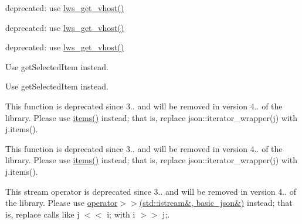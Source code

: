 \begin{DoxyRefList}
deprecated\+: use \hyperlink{group__context-and-vhost_ga26bb300d01fa3e443d4ccdf384e99c7f}{lws\+\_\+get\+\_\+vhost()} 

deprecated\+: use \hyperlink{group__context-and-vhost_ga26bb300d01fa3e443d4ccdf384e99c7f}{lws\+\_\+get\+\_\+vhost()} 

deprecated\+: use \hyperlink{group__context-and-vhost_ga26bb300d01fa3e443d4ccdf384e99c7f}{lws\+\_\+get\+\_\+vhost()}  
\item[\label{deprecated__deprecated000028}%
\Hypertarget{deprecated__deprecated000028}%
Member \hyperlink{classMenuItemToggle_a290e987c2bf2190b9aac3287617d4e9d}{Menu\+Item\+Toggle\+:\+:selected\+Item} ()]Use {\ttfamily get\+Selected\+Item} instead. 

Use {\ttfamily get\+Selected\+Item} instead.  
\item[\label{deprecated__deprecated000001}%
\Hypertarget{deprecated__deprecated000001}%
Member \hyperlink{classnlohmann_1_1basic__json_a22e2e5b0e68d9d7c63be2cada5187259}{nlohmann\+:\+:basic\+\_\+json$<$ Object\+Type, Array\+Type, String\+Type, Boolean\+Type, Number\+Integer\+Type, Number\+Unsigned\+Type, Number\+Float\+Type, Allocator\+Type, J\+S\+O\+N\+Serializer, Binary\+Type $>$\+:\+:iterator\+\_\+wrapper} (reference ref) noexcept]This function is deprecated since 3.. and will be removed in version 4.. of the library. Please use \hyperlink{classnlohmann_1_1basic__json_a916a6ba75ec7624e9c6c977a52d6fd17}{items()} instead; that is, replace {\ttfamily json\+::iterator\+\_\+wrapper(j)} with {\ttfamily j.\+items()}.  
\item[\label{deprecated__deprecated000002}%
\Hypertarget{deprecated__deprecated000002}%
Member \hyperlink{classnlohmann_1_1basic__json_a3710ff8c5a1cbedb4f75b700a8962d5c}{nlohmann\+:\+:basic\+\_\+json$<$ Object\+Type, Array\+Type, String\+Type, Boolean\+Type, Number\+Integer\+Type, Number\+Unsigned\+Type, Number\+Float\+Type, Allocator\+Type, J\+S\+O\+N\+Serializer, Binary\+Type $>$\+:\+:iterator\+\_\+wrapper} (const\+\_\+reference ref) noexcept]This function is deprecated since 3.. and will be removed in version 4.. of the library. Please use \hyperlink{classnlohmann_1_1basic__json_a916a6ba75ec7624e9c6c977a52d6fd17}{items()} instead; that is, replace {\ttfamily json\+::iterator\+\_\+wrapper(j)} with {\ttfamily j.\+items()}.  
\item[\label{deprecated__deprecated000005}%
\Hypertarget{deprecated__deprecated000005}%
Member \hyperlink{classnlohmann_1_1basic__json_a60ca396028b8d9714c6e10efbf475af6}{nlohmann\+:\+:basic\+\_\+json$<$ Object\+Type, Array\+Type, String\+Type, Boolean\+Type, Number\+Integer\+Type, Number\+Unsigned\+Type, Number\+Float\+Type, Allocator\+Type, J\+S\+O\+N\+Serializer, Binary\+Type $>$\+:\+:operator$<$$<$} (\hyperlink{classnlohmann_1_1basic__json}{basic\+\_\+json} \&j, std\+::istream \&i)]This stream operator is deprecated since 3.. and will be removed in version 4.. of the library. Please use \hyperlink{classnlohmann_1_1basic__json_aaf363408931d76472ded14017e59c9e8}{operator$>$$>$(std\+::istream\&, basic\+\_\+json\&)} instead; that is, replace calls like {\ttfamily j $<$$<$ i;} with {\ttfamily i $>$$>$ j;}.  

\end{DoxyRefList}
